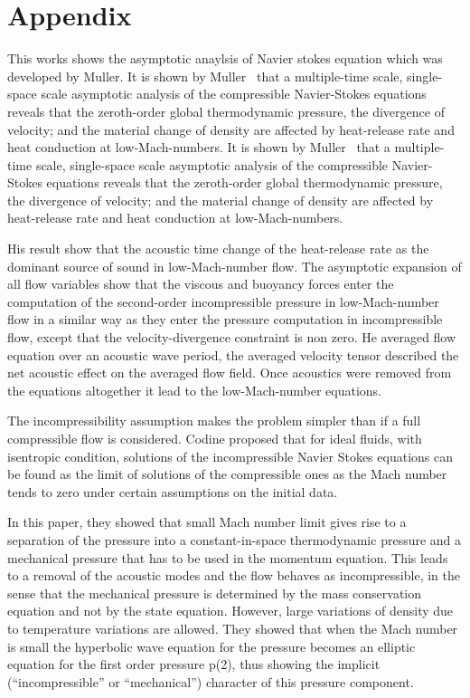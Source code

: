 \chapter{Appendix}\label{chap:app}

\noindent This works shows the asymptotic anaylsis of Navier stokes equation which was developed by Muller\cite{Muller}. It is shown by Muller~\cite{Muller} that a multiple-time scale, single-space scale asymptotic analysis of the compressible Navier-Stokes equations reveals that the zeroth-order global thermodynamic pressure, the divergence of velocity; and the material change of density are affected by heat-release rate and heat conduction at low-Mach-numbers.
It is shown by Muller~\cite{Muller} that a multiple-time scale, single-space scale asymptotic analysis of the compressible Navier-Stokes equations reveals that the zeroth-order global thermodynamic pressure, the divergence of velocity; and the material change of density are affected by heat-release rate and heat conduction at low-Mach-numbers.

\bigskip
\noindent His result show that the acoustic time change of the heat-release rate as the dominant source of sound in low-Mach-number flow. The asymptotic expansion of all flow variables show that the viscous and buoyancy forces enter the computation of the second-order incompressible pressure in low-Mach-number flow in a similar way as they enter the pressure computation in incompressible flow, except that the
velocity-divergence constraint is non zero. He averaged flow equation over an acoustic wave period, the averaged velocity tensor described the net acoustic effect on the averaged flow field. Once acoustics were removed from the equations altogether it lead to the low-Mach-number equations.

\bigskip
\noindent The incompressibility assumption makes the problem simpler than if a full compressible flow is considered. Codine  proposed that for ideal fluids, with isentropic condition, solutions of the incompressible Navier Stokes equations can be found as the limit of solutions of the compressible ones as the Mach number tends to zero under certain assumptions on the initial data.

\noindent In this paper, they showed that small Mach number limit gives rise to a separation of the pressure into a constant-in-space thermodynamic pressure and a mechanical pressure that has to be used in the momentum equation. This leads to a removal of the acoustic modes and the flow behaves as incompressible, in the sense that the mechanical pressure is determined by the mass conservation
equation and not by the state equation. However, large variations of density
due to temperature variations are allowed. They showed that when the Mach number is small the hyperbolic wave equation for the pressure becomes an elliptic
equation for the first order pressure p(2), thus showing the implicit (“incompressible” or “mechanical”) character of this pressure component.


